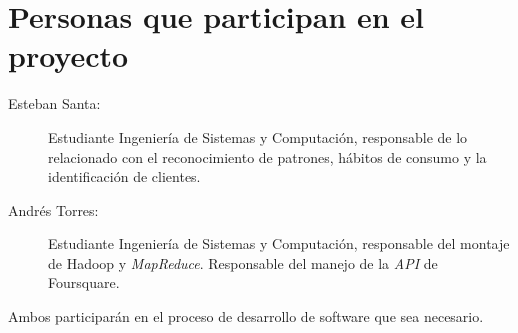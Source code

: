 \chapter{Personas que participan en el proyecto}
\label{sec:personas}
\begin{description}
\item[Esteban Santa:]Estudiante Ingenier\'ia de Sistemas y Computaci\'on, responsable de lo relacionado con el reconocimiento de patrones, h\'abitos de consumo y la identificaci\'on de clientes.
\item[Andr\'es Torres:]Estudiante Ingenier\'ia de Sistemas y Computaci\'on, responsable del montaje de Hadoop y \textit{MapReduce}. Responsable del manejo de la \textit{API} de Foursquare. 
\end{description}
Ambos participar\'an en el proceso de desarrollo de software que sea necesario.
\pagebreak